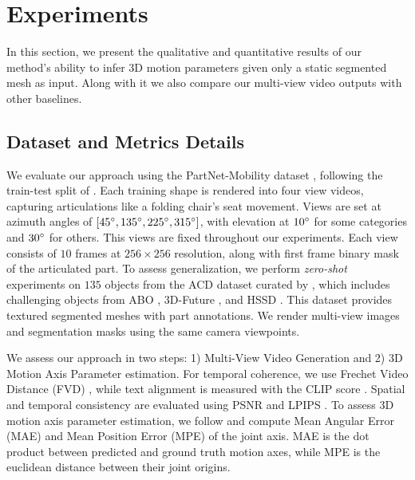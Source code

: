 \section{Experiments}
\label{experiments}

In this section, we present the qualitative and quantitative results of our method's ability to infer 3D motion parameters given only a static segmented mesh as input. Along with it we also compare our multi-view video outputs with other baselines.
\subsection{Dataset and Metrics Details}
We evaluate our approach using the PartNet-Mobility dataset \cite{xiang2020sapien}, following the train-test split of \cite{kim2024partstad, liu2023partslip}. Each training shape is rendered into four view videos, capturing articulations like a folding chair’s seat movement. Views are set at azimuth angles of $[45\degree, 135\degree, 225\degree, 315\degree]$, with elevation at $10\degree$ for some categories and $30\degree$ for others. This views are fixed throughout our experiments. Each view consists of $10$ frames at $256\times256$ resolution, along with first frame binary mask of the articulated part. To assess generalization, we perform \emph{zero-shot} experiments on $135$ objects from the ACD dataset \cite{iliash2024s2o} curated by \cite{liu2024singapo}, which includes challenging objects from ABO \cite{collins2022abo}, 3D-Future \cite{fu20213d}, and HSSD \cite{khanna2024habitat}. This dataset provides textured segmented meshes with part annotations. We render multi-view images and segmentation masks using the same camera viewpoints. 

We assess our approach in two steps: 1) Multi-View Video Generation and 2) 3D Motion Axis Parameter estimation. For temporal coherence, we use Frechet Video Distance (FVD) \cite{unterthiner2019fvd}, while text alignment is measured with the CLIP score \cite{CLIP1}. Spatial and temporal consistency are evaluated using PSNR and LPIPS \cite{zhang2018perceptual}. To assess 3D motion axis parameter estimation, we follow \cite{wang2019shape2motion, jiang2022opd} and compute Mean Angular Error (MAE) and Mean Position Error (MPE) of the joint axis. MAE is the dot product between predicted and ground truth motion axes, while MPE is the euclidean distance between their joint origins.

